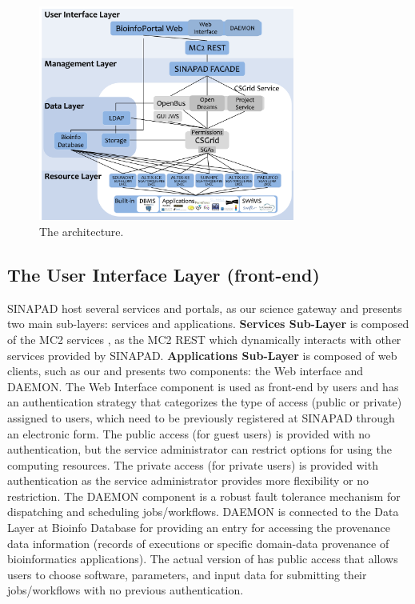\begin{figure}[!t]
\centering
\includegraphics[width=0.75\textwidth]{imgs/bioinfoportal.png}
\vspace{-10px}
\caption{The \system architecture.}
\label{fig:bioinfoportal}
\end{figure}

\subsection{The User Interface Layer (front-end)}

SINAPAD host several services and portals, as our science gateway \system and presents two main sub-layers: services and applications. \textbf{Services Sub-Layer} is composed of the MC2 services \cite{doi:10.1002/cpe.3258}, as the MC2 REST which dynamically interacts with other services provided by SINAPAD. \textbf{Applications Sub-Layer} is composed of web clients, such as our \system and presents two components: the Web interface and DAEMON. The Web Interface component is used as front-end by users and has an authentication strategy that categorizes the type of access (public or private) assigned to users, which need to be previously registered at SINAPAD through an electronic form. The public access (for guest users) is provided with no authentication, but the service administrator can restrict options for using the computing resources. The private access (for private users) is provided with authentication as the service administrator provides more flexibility or no restriction. The DAEMON component is a robust fault tolerance mechanism for dispatching and scheduling jobs/workflows. DAEMON is connected to the Data Layer at Bioinfo Database for providing an entry for accessing the provenance data information (records of executions or specific domain-data provenance of bioinformatics applications).
The actual version of \system has public access that allows users to choose software, parameters, and input data for submitting their jobs/workflows with no previous authentication.

